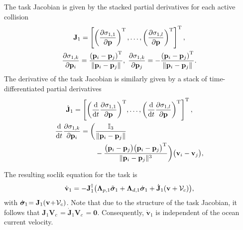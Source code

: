 The task Jacobian is given by the stacked partial derivatives for each active collision
\begin{subequations}
\begin{gather}
    \mathbf{J}_1 = \left[\left(\frac{\partial \sigma_{1,1}}{\partial \mathbf{p}}\right)^{\mathrm{T}}, \ldots, \left(\frac{\partial \sigma_{1,l}}{\partial \mathbf{p}}\right)^{\mathrm{T}}\right]^{\mathrm{T}},\\
    \frac{\partial \sigma_{1,k}}{\partial \mathbf{p}_i} =\frac{\left(\mathbf{p}_i-\mathbf{p}_j\right) ^{\mathrm{T}}}{\|\mathbf{p}_i - \mathbf{p}_j\|}, \; \frac{\partial \sigma_{1,k}}{\partial \mathbf{p}_j} = -\frac{\left(\mathbf{p}_i-\mathbf{p}_j\right) ^{\mathrm{T}}}{\|\mathbf{p}_i - \mathbf{p}_j\|}.
\end{gather}
\end{subequations}
The derivative of the task Jacobian is similarly given by a stack of time-differentiated partial derivatives
\begin{subequations}
\begin{gather}
    \dot{\mathbf{J}}_1 = \left[{\left(\frac{{\rm d}}{{\rm d}t}\frac{\partial \sigma_{1,1}}{\partial \mathbf{p}}\right)}\T, \ldots, {\left(\frac{{\rm d}}{{\rm d}t}\frac{\partial \sigma_{1,l}}{\partial \mathbf{p}}\right)}\T\right]\T,\\
    \begin{split}
    {\frac{{\rm d}}{{\rm d}t}\frac{\partial \sigma_{1,k}}{\partial \mathbf{p}_i}}= \bigg(&\frac{\mathbb{I}_3}{\|\mathbf{p}_i - \mathbf{p}_j\|} \\&- \frac{\bigl(\mathbf{p}_i-\mathbf{p}_j\bigr)\bigl(\mathbf{p}_i-\mathbf{p}_j\bigr)\T}{\|\mathbf{p}_i - \mathbf{p}_j\|^3}\bigg)\bigl(\mathbf{v}_i-\mathbf{v}_j\bigr),
    \end{split}%
\end{gather}
\end{subequations}

The resulting \gls{soclik} equation for the task is
\begin{equation}
    \dot{\mathbf{v}}_1 = -\mathbf{J}_1^\dagger \bigl( \mathbf{\Lambda}_{p,1}\Tilde{\bm{\sigma}}_1 + \mathbf{\Lambda}_{d,1} \dot{\bm{\sigma}}_1 + \dot{\mathbf{J}}_1 (\mathbf{v}+\mathcal{V}_c)\bigr),
\end{equation}
with $\dot{\bm{\sigma}}_{1\,} \!\!= \mathbf{J}_1 (\mathbf{v}\! + \!\mathcal{V}_c)$. %
Note that due to the structure of the task Jacobian, it follows that $\mathbf{J}_1 \mathbf{V}_{c\,} \!\!= \dot{\mathbf{J}}_1 \mathbf{V}_{c\,} \!\!= \mathbf{0}$. Consequently, $\dot{\mathbf{v}}_1$ is independent of the ocean current velocity.

